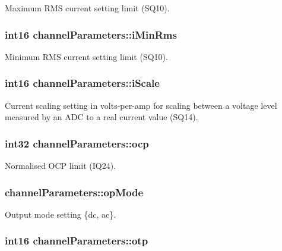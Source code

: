 Maximum R\-M\-S current setting limit (S\-Q10). \hypertarget{structchannel_parameters_a12f6946f5b0ee1235d7edcb6a22a4518}{
\subsubsection[{i\-Min\-Rms}]{\setlength{\rightskip}{0pt plus 5cm}int16 channel\-Parameters\-::i\-Min\-Rms}}\label{structchannel_parameters_a12f6946f5b0ee1235d7edcb6a22a4518}
Minimum R\-M\-S current setting limit (S\-Q10). \hypertarget{structchannel_parameters_a022031c9e8a34b37c6cd05d8d7934a13}{
\subsubsection[{i\-Scale}]{\setlength{\rightskip}{0pt plus 5cm}int16 channel\-Parameters\-::i\-Scale}}\label{structchannel_parameters_a022031c9e8a34b37c6cd05d8d7934a13}
Current scaling setting in volts-\/per-\/amp for scaling between a voltage level measured by an A\-D\-C to a real current value (S\-Q14). \hypertarget{structchannel_parameters_a95bd86963045f10f75c656956a09858c}{
\subsubsection[{ocp}]{\setlength{\rightskip}{0pt plus 5cm}int32 channel\-Parameters\-::ocp}}\label{structchannel_parameters_a95bd86963045f10f75c656956a09858c}
Normalised O\-C\-P limit (I\-Q24). \hypertarget{structchannel_parameters_a25d490fa4d7487c8e2e21c1400a6b99b}{
\subsubsection[{op\-Mode}]{ channel\-Parameters\-::op\-Mode}}\label{structchannel_parameters_a25d490fa4d7487c8e2e21c1400a6b99b}
Output mode setting \{dc, ac\}. \hypertarget{structchannel_parameters_a9df39dee6c165c882bb04e26b17e3e25}{
\subsubsection[{otp}]{\setlength{\rightskip}{0pt plus 5cm}int16 channel\-Parameters\-::otp}}\label{structchannel_parameters_a9df39dee6c165c882bb04e26b17e3e25}
